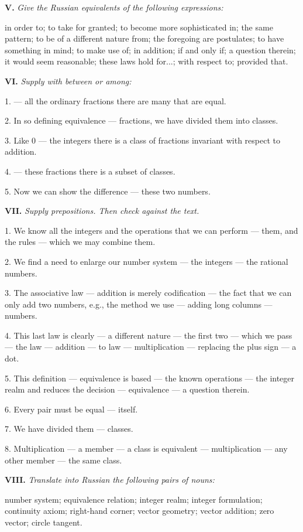 \documentclass[a4paper]{article}
\newcommand{\ETask}[2]{\medskip\par\textbf{#1.} \textit{#2}\par}
\begin{document}
\ETask{V}{Give the Russian equivalents of the following expressions:}
in order to; to take for granted; to become more sophisticated in; the same pattern; to be of a different nature from; the
foregoing are postulates; to have something in mind; to make use of; in addition; if and only if; a question therein; it
would seem reasonable; these laws hold for...; with respect to; provided that.

\ETask{VI}{Supply with between or among:}
1. --- all the ordinary fractions there are many that are equal.

2. In so defining equivalence --- fractions, we have divided them into classes.

3. Like 0 --- the integers there is a class of fractions invariant with respect to addition.

4. --- these fractions there is a subset of classes.

5. Now we can show the difference --- these two numbers.

\ETask{VII}{Supply prepositions. Then check against the text.}

1. We know all the integers and the operations that we can perform --- them, and the rules --- which we may combine them.

2. We find a need to enlarge our number system --- the integers --- the rational numbers.

3. The associative law --- addition is merely codification --- the fact that we can only add two numbers, e.g., the method we
use --- adding long columns --- numbers.

4. This last law is clearly --- a different nature --- the first two --- which we pass --- the law --- addition --- to law
--- multiplication --- replacing the plus sign --- a dot.

5. This definition --- equivalence is based --- the known operations --- the integer realm and reduces the decision ---
equivalence --- a question therein.

6. Every pair must be equal --- itself.

7. We have divided them --- classes.

8. Multiplication --- a member --- a class is equivalent --- multiplication --- any other member --- the same class.

\ETask{VIII}{Translate into Russian the following pairs of nouns:}
number system; equivalence relation; integer realm; integer formulation; continuity axiom; right-hand corner; vector
geometry; vector addition; zero vector; circle tangent.
\end{document}
